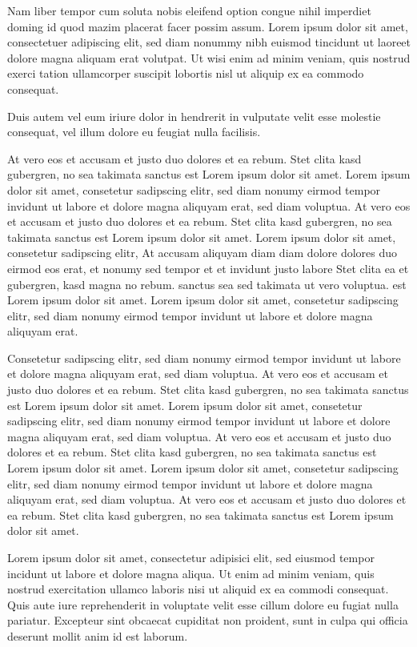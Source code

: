 \documentclass[twoside,a4paper]{article}
\begin{document}
Nam liber tempor cum soluta nobis eleifend option congue nihil imperdiet doming
id quod mazim placerat facer possim assum. Lorem ipsum dolor sit amet,
consectetuer adipiscing elit, sed diam nonummy nibh euismod tincidunt ut
laoreet dolore magna aliquam erat volutpat. Ut wisi enim ad minim veniam, quis
nostrud exerci tation ullamcorper suscipit lobortis nisl ut aliquip ex ea
commodo consequat.

Duis autem vel eum iriure dolor in hendrerit in vulputate velit esse molestie
consequat, vel illum dolore eu feugiat nulla facilisis.

At vero eos et accusam et justo duo dolores et ea rebum. Stet clita kasd
gubergren, no sea takimata sanctus est Lorem ipsum dolor sit amet. Lorem ipsum
dolor sit amet, consetetur sadipscing elitr, sed diam nonumy eirmod tempor
invidunt ut labore et dolore magna aliquyam erat, sed diam voluptua. At vero
eos et accusam et justo duo dolores et ea rebum. Stet clita kasd gubergren, no
sea takimata sanctus est Lorem ipsum dolor sit amet. Lorem ipsum dolor sit
amet, consetetur sadipscing elitr, At accusam aliquyam diam diam dolore dolores
duo eirmod eos erat, et nonumy sed tempor et et invidunt justo labore Stet
clita ea et gubergren, kasd magna no rebum. sanctus sea sed takimata ut vero
voluptua. est Lorem ipsum dolor sit amet. Lorem ipsum dolor sit amet,
consetetur sadipscing elitr, sed diam nonumy eirmod tempor invidunt ut labore
et dolore magna aliquyam erat.

Consetetur sadipscing elitr, sed diam nonumy eirmod tempor invidunt ut labore
et dolore magna aliquyam erat, sed diam voluptua. At vero eos et accusam et
justo duo dolores et ea rebum. Stet clita kasd gubergren, no sea takimata
sanctus est Lorem ipsum dolor sit amet. Lorem ipsum dolor sit amet, consetetur
sadipscing elitr, sed diam nonumy eirmod tempor invidunt ut labore et dolore
magna aliquyam erat, sed diam voluptua. At vero eos et accusam et justo duo
dolores et ea rebum. Stet clita kasd gubergren, no sea takimata sanctus est
Lorem ipsum dolor sit amet. Lorem ipsum dolor sit amet, consetetur sadipscing
elitr, sed diam nonumy eirmod tempor invidunt ut labore et dolore magna aliquyam
erat, sed diam voluptua. At vero eos et accusam et justo duo dolores et ea
rebum. Stet clita kasd gubergren, no sea takimata sanctus est Lorem ipsum dolor
sit amet.

Lorem ipsum dolor sit amet, consectetur adipisici elit, sed eiusmod tempor
incidunt ut labore et dolore magna aliqua. Ut enim ad minim veniam, quis
nostrud exercitation ullamco laboris nisi ut aliquid ex ea commodi consequat.
Quis aute iure reprehenderit in voluptate velit esse cillum dolore eu fugiat
nulla pariatur. Excepteur sint obcaecat cupiditat non proident, sunt in culpa
qui officia deserunt mollit anim id est laborum.
\end{document}
